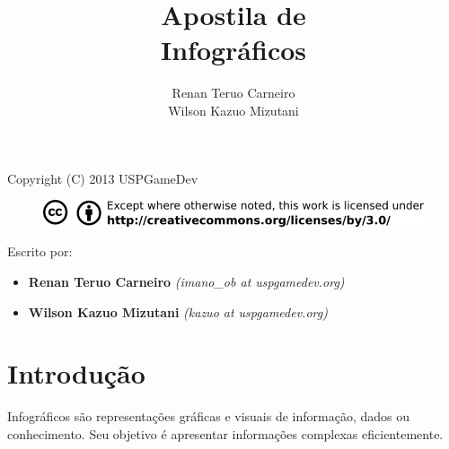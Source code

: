 \documentclass[12pt,onecolumn]{article}
\begin{document}
\begin{titlepage}

    \title{
        \bf
        \LARGE Apostila de \\
        \Huge  Infográficos
    }
    
    \author{Renan Teruo Carneiro \\ Wilson Kazuo Mizutani}
    
    \maketitle
    
    \thispagestyle{empty}
    
\end{titlepage}

\begin{center}
  Copyright (C) 2013 USPGameDev
\end{center}
\begin{figure}[ht]
  \centering
  \includegraphics[width=\textwidth]{CC-BY.png}
\end{figure}

\vspace{300pt}

Escrito por:
\begin{itemize}
  \item \textbf{Renan Teruo Carneiro} \textit{(imano\_ob at uspgamedev.org)}
  \item \textbf{Wilson Kazuo Mizutani} \textit{(kazuo at uspgamedev.org)}
\end{itemize}

\clearpage

\tableofcontents

\clearpage

\section{Introdução}
  Infográficos são representações gráficas e visuais de informação, dados ou
  conhecimento. Seu objetivo é apresentar informações complexas
  eficientemente\footnotemark.
  
  
\end{document}
